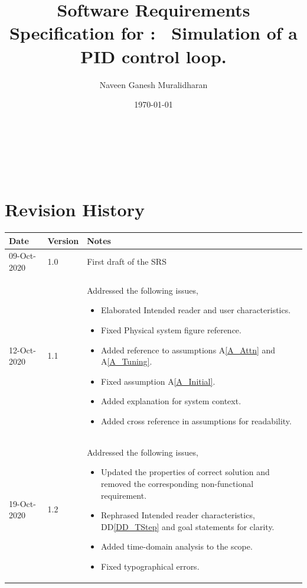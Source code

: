 \documentclass[12pt]{article}
\newcommand{\ddref}[1]{DD\ref{#1}}
\newcommand{\aref}[1]{A\ref{#1}}
\begin{document}
\title{Software Requirements Specification for \progname: \
Simulation of a PID control loop.} 
\author{Naveen Ganesh Muralidharan}
\date{\today}
	
\maketitle

~\newpage


\tableofcontents

~\newpage

\section*{Revision History}

\begin{tabularx}{\textwidth}{p{3cm}p{2cm}X}
\toprule {\bf Date} & {\bf Version} & {\bf Notes}\\
\midrule
09-Oct-2020 & 1.0 & First draft of the SRS\\
12-Oct-2020 & 1.1 & Addressed the following issues,
\begin{itemize}
\item Elaborated Intended reader and user characteristics.
\item Fixed Physical system figure reference.
\item Added reference to assumptions \aref{A_Attn} and \aref{A_Tuning}.
\item Fixed assumption \aref{A_Initial}.
\item Added explanation for system context.
\item Added cross reference in assumptions for readability.
\end{itemize}\\
19-Oct-2020 & 1.2 & Addressed the following issues,
\begin{itemize}
\item Updated the properties of correct solution and removed the corresponding
non-functional requirement.
\item Rephrased Intended reader characteristics, \ddref{DD_TStep} and goal statements for
clarity.
\item Added time-domain analysis to the scope.
\item Fixed typographical errors.
\end{itemize}\\
\bottomrule
\end{tabularx}
\end{document}
